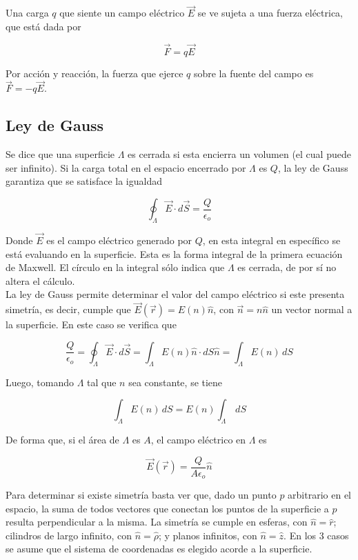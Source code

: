 Una carga $q$ que siente un campo eléctrico $\Vec{E}$ se ve sujeta a una fuerza eléctrica, que está dada por

\[\Vec{F} = q\Vec{E}\]

Por acción y reacción, la fuerza que ejerce $q$ sobre la fuente del campo es $\Vec{F} = -q\Vec{E}$.

\subsection{Ley de Gauss}

Se dice que una superficie $\Lambda$ es cerrada si esta encierra un volumen (el cual puede ser infinito). Si la carga total en el espacio encerrado por $\Lambda$ es $Q$, la ley de Gauss garantiza que se satisface la igualdad

\[\oint_{\Lambda} \Vec{E}\cdot d\Vec{S} = \frac{Q}{\epsilon_o}\]

Donde $\Vec{E}$ es el campo eléctrico generado por $Q$, en esta integral en específico se está evaluando en la superficie. Esta es la forma integral de la primera ecuación de Maxwell. El círculo en la integral sólo indica que $\Lambda$ es cerrada, de por sí no altera el cálculo.\\

La ley de Gauss permite determinar el valor del campo eléctrico si este presenta simetría, es decir, cumple que $\Vec{E}(\Vec{r}) = E(n)\hat{n}$, con $\Vec{n} = n\hat{n}$ un vector normal a la superficie. En este caso se verifica que

\[\frac{Q}{\epsilon_o} = \oint_{\Lambda} \Vec{E}\cdot d\Vec{S} = \int_{\Lambda} E(n)\hat{n}\cdot dS\hat{n} = \int_{\Lambda} E(n) \,dS\]

Luego, tomando $\Lambda$ tal que $n$ sea constante, se tiene

\[\int_{\Lambda} E(n)\,dS = E(n)\int_{\Lambda}\,dS\]

De forma que, si el área de $\Lambda$ es $A$, el campo eléctrico en $\Lambda$ es

\[\Vec{E}(\Vec{r}) = \frac{Q}{A\epsilon_o}\hat{n}\]

Para determinar si existe simetría basta ver que, dado un punto $p$ arbitrario en el espacio, la suma de todos vectores que conectan los puntos de la superficie a $p$ resulta perpendicular a la misma.
\bigbreak
La simetría se cumple en esferas, con $\hat{n}=\hat{r}$; cilindros de largo infinito, con $\hat{n}=\hat{\rho}$; y planos infinitos, con $\hat{n}=\hat{z}$. En los 3 casos se asume que el sistema de coordenadas es elegido acorde a la superficie.



\newpage
